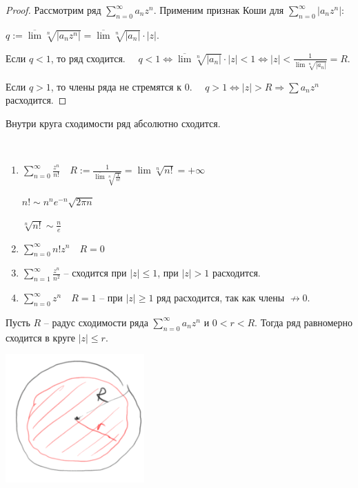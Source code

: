 \begin{proof}
    Рассмотрим ряд $\sum\limits_{n=0}^\infty a_nz^n$. Применим признак Коши для $\sum\limits_{n=0}^\infty |a_nz^n|$:
    
    $q:=\overline{\lim}\sqrt[n]{|a_nz^n|}=\overline{\lim}\sqrt[n]{|a_n|}\cdot|z|$.

    Если $q<1$, то ряд сходится. $   \quad q<1\Leftrightarrow \overline{\lim} \sqrt[n]{|a_n|}\cdot |z|<1\Leftrightarrow |z|<\frac{1}{\overline{\lim} \sqrt[n]{|a_n|}}=R$.

    Если $q>1$, то члены ряда не стремятся к 0. $\quad q>1\Leftrightarrow |z|>R\Rightarrow \sum a_nz^n$ расходится.
\end{proof}

\begin{remark}
    Внутри круга сходимости ряд абсолютно сходится.
\end{remark}

\begin{example}~
    \begin{enumerate}
        \item $\sum\limits_{n=0}^\infty \frac{z^n}{n!}\quad R:=\frac{1}{\overline{\lim}\sqrt[n]{\frac{1}{n!}}}=\lim \sqrt[n]{n!}=+\infty$

        $n!\sim n^ne^{-n}\sqrt{2\pi n}$

        $\sqrt[n]{n!}\sim\frac{n}{e}$
        \item $\sum\limits_{n=0}^\infty n!z^n\quad R=0$

        \item $\sum\limits_{n=1}^\infty \frac{z^n}{n^2}$ – сходится при $|z|\leq 1$, при $|z|>1$ расходится.

        \item $\sum\limits_{n=0}^\infty z^n\quad R=1$ – при $|z|\geq 1$ ряд расходится, так как члены $\not\rightarrow 0$.
    \end{enumerate}
\end{example}

\begin{theorem}
    Пусть $R$ – радус сходимости ряда $\sum\limits_{n=0}^\infty a_nz^n$ и $0<r<R$. Тогда ряд равномерно сходится в круге $|z|\leq r$.

    \includegraphics[width=0.2\linewidth]{images/10-05-2.png}
\end{theorem}

